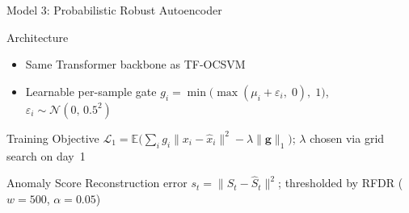 \documentclass{beamer}
\begin{document}
\begin{frame}{Model 3: Probabilistic Robust Autoencoder \cite{lindenbaum2022prae}}
    \begin{block}{Architecture}
        \begin{itemize}
            \item Same Transformer backbone as TF-OCSVM
            \item Learnable per-sample gate $g_i = \min\bigl(\max(\mu_i + \varepsilon_i,\; 0),\; 1\bigr)$, \quad $\varepsilon_i \sim \mathcal{N}(0,\, 0.5^2)$
        \end{itemize}
    \end{block}
    \begin{block}{Training Objective}
        $\mathcal{L}_1 = \mathbb{E}\bigl(\sum_i g_i \|x_i - \hat{x}_i\|^2 - \lambda \|\mathbf{g}\|_1\bigr)$; $\lambda$ chosen via grid search on day~1
    \end{block}
    \begin{block}{Anomaly Score}
        Reconstruction error $s_t = \|S_t - \hat{S}_t\|^2$; thresholded by RFDR ($w{=}500$, $\alpha{=}0.05$)
    \end{block}
\end{frame}
\end{document}
